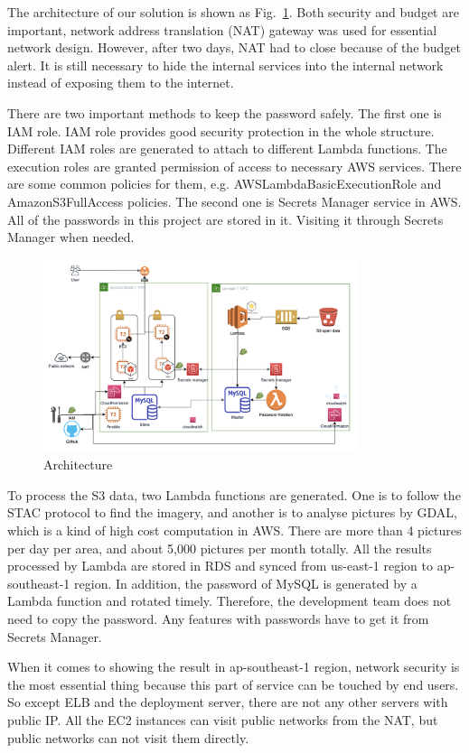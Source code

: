 \documentclass[conference]{IEEEtran}
\begin{document}
The architecture of our solution is shown as Fig.~\ref{fig2}. Both security and budget are important, network address translation (NAT) gateway 
was used for essential network design. However, after two days, NAT had to close because of the budget alert. It is still necessary to hide the 
internal services into the internal network instead of exposing them to the internet.

There are two important methods to keep the password safely. The first one is IAM role. IAM role provides good security protection in the whole structure.
Different IAM roles are generated to attach to different Lambda functions. The execution roles are granted permission of access to necessary AWS services. 
There are some common policies for them, e.g. AWSLambdaBasicExecutionRole and AmazonS3FullAccess policies. The second one is Secrets Manager service in AWS.
All of the passwords in this project are stored in it. Visiting it through Secrets Manager when needed.


\begin{figure}[htbp]
    \centerline{\includegraphics[width=260pt]{images/arch.png}}
    \caption{Architecture}
    \label{fig2}
\end{figure}
    
To process the S3 data, two Lambda functions are generated. One is to follow the STAC protocol to find the imagery, and another is to analyse pictures by GDAL, 
which is a kind of high cost computation in AWS. There are more than 4 pictures per day per area, and about 5,000 pictures per month totally. All the results processed by 
Lambda are stored in RDS and synced from us-east-1 region to ap-southeast-1 region. In addition, the password of MySQL is generated by a Lambda function and rotated 
timely. Therefore, the development team does not need to copy the password. Any features with passwords have to get it from Secrets Manager. 

When it comes to showing the result in ap-southeast-1 region, network security is the most essential thing because this part of service can be touched by end users. 
So except ELB and the deployment server, there are not any other servers with public IP. All the EC2 instances can visit public networks from the NAT, but public networks 
can not visit them directly.
\end{document}
